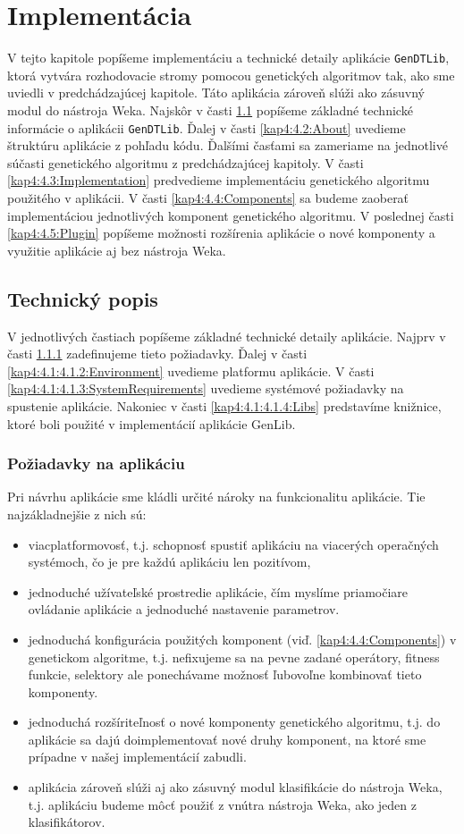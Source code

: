 \chapter{Implementácia}
V tejto kapitole popíšeme implementáciu a technické detaily aplikácie \verb|GenDTLib|, ktorá vytvára rozhodovacie stromy pomocou genetických algoritmov tak, ako sme uviedli v predchádzajúcej kapitole. Táto aplikácia zároveň slúži ako zásuvný modul do nástroja Weka. Najskôr v časti \ref{kap4:4.1:Info} popíšeme základné technické informácie o aplikácii \verb|GenDTLib|. Ďalej v časti \ref{kap4:4.2:About} uvedieme štruktúru aplikácie z pohľadu kódu. Ďalšími časťami sa zameriame na jednotlivé súčasti genetického algoritmu z predchádzajúcej kapitoly. V časti \ref{kap4:4.3:Implementation} predvedieme implementáciu genetického algoritmu použitého v aplikácii. V časti \ref{kap4:4.4:Components} sa budeme zaoberať implementáciou jednotlivých komponent genetického algoritmu. V poslednej časti \ref{kap4:4.5:Plugin} popíšeme možnosti rozšírenia aplikácie o nové komponenty a využitie aplikácie aj bez nástroja Weka.
\section{Technický popis}\label{kap4:4.1:Info}
V jednotlivých častiach popíšeme základné technické detaily aplikácie. Najprv v časti \ref{kap4:4.1:4.1.1:Requirements} zadefinujeme tieto požiadavky. Ďalej v časti \ref{kap4:4.1:4.1.2:Environment} uvedieme platformu aplikácie. V časti \ref{kap4:4.1:4.1.3:SystemRequirements} uvedieme systémové požiadavky na spustenie aplikácie. Nakoniec v časti \ref{kap4:4.1:4.1.4:Libs} predstavíme knižnice, ktoré boli použité v implementácií aplikácie GenLib.

\subsection{Požiadavky na aplikáciu}\label{kap4:4.1:4.1.1:Requirements}
Pri návrhu aplikácie sme kládli určité nároky na funkcionalitu aplikácie. Tie najzákladnejšie z nich sú:
\begin{itemize}
\item viacplatformovosť, t.j. schopnosť spustiť aplikáciu na viacerých operačných systémoch, čo je pre každú aplikáciu len pozitívom,
\item jednoduché užívateľské prostredie aplikácie, čím myslíme priamočiare ovládanie aplikácie a jednoduché nastavenie parametrov.
\item jednoduchá konfigurácia použitých komponent (viď. \ref{kap4:4.4:Components}) v genetickom algoritme, t.j. nefixujeme sa na pevne zadané operátory, fitness funkcie, selektory ale ponechávame možnosť ľubovoľne kombinovať tieto komponenty.
\item jednoduchá rozšíriteľnosť o nové komponenty genetického algoritmu, t.j. do aplikácie sa dajú doimplementovať nové druhy komponent, na ktoré sme prípadne v našej implementácií zabudli. 
\item aplikácia zároveň slúži aj ako zásuvný modul klasifikácie do nástroja Weka, t.j. aplikáciu budeme môcť použiť z vnútra nástroja Weka, ako jeden z klasifikátorov. 
\end{itemize}

